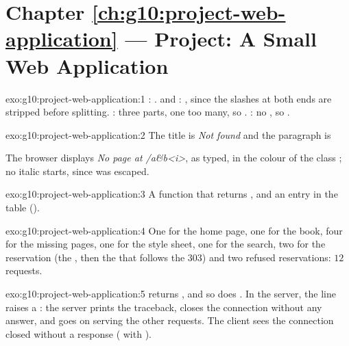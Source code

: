 \section*{Chapter \ref{ch:g10:project-web-application} --- Project: A Small Web Application}

\begin{solution}{exo:g10:project-web-application:1}
\code{/}: .  and : , since the slashes at
both ends are stripped before splitting. : three parts, one too many, so
. : no  , so .
\end{solution}

\begin{solution}{exo:g10:project-web-application:2}
The title is \textit{Not found} and the paragraph is

\smallskip\noindent\hspace*{2em}

\smallskip\noindent The browser displays \textit{No page at /a\&b<i>}, as
typed, in the colour of the class ; no italic starts, since  was escaped.
\end{solution}

\begin{solution}{exo:g10:project-web-application:3}
A function  that returns , and an entry
 in the  table ().
\end{solution}

\begin{solution}{exo:g10:project-web-application:4}
One for the home page, one for the book, four for the missing pages, one for the style sheet, one for the search,
two for the reservation (the , then the  that follows the 303) and two refused reservations: $12$ requests.
\end{solution}

\begin{solution}{exo:g10:project-web-application:5}
 returns , and so does . In the server, the line
 raises a : the server prints the
traceback, closes the connection without any answer, and goes on serving the other requests. The client sees the
connection closed without a response ( with ).
\end{solution}

